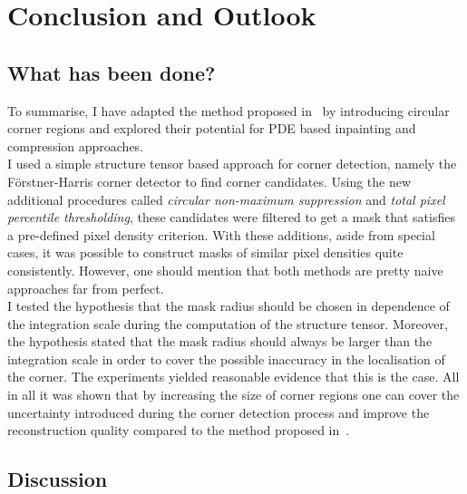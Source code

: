 \chapter{Conclusion and Outlook}\label{ch:Conclusion}

\section{What has been done?}

To summarise, I have adapted the method proposed in~\cite{zimmer07} by introducing circular corner
regions and explored their potential for PDE based inpainting and compression approaches.\\
I used a simple structure tensor based approach for corner detection, namely the Förstner-Harris
corner detector to find corner candidates. Using the new additional procedures called
\textit{circular non-maximum suppression} and \textit{total pixel percentile thresholding}, these
candidates were filtered to get a mask that satisfies a pre-defined pixel density criterion. With
these additions, aside from special cases, it was possible to construct masks of similar pixel
densities quite consistently. However, one should mention that both methods are pretty naive
approaches far from perfect.\\
I tested the hypothesis that the mask radius should be chosen in dependence of the integration
scale during the computation of the structure tensor. Moreover, the hypothesis stated that the mask
radius should always be larger than the integration scale in order to cover the possible inaccuracy
in the localisation of the corner. The experiments yielded reasonable evidence that this is the
case. 
All in all it was shown that by increasing the size of corner regions one can cover the uncertainty
introduced during the corner detection process and improve the reconstruction quality compared to
the method proposed in~\cite{zimmer07}.

\section{Discussion}

